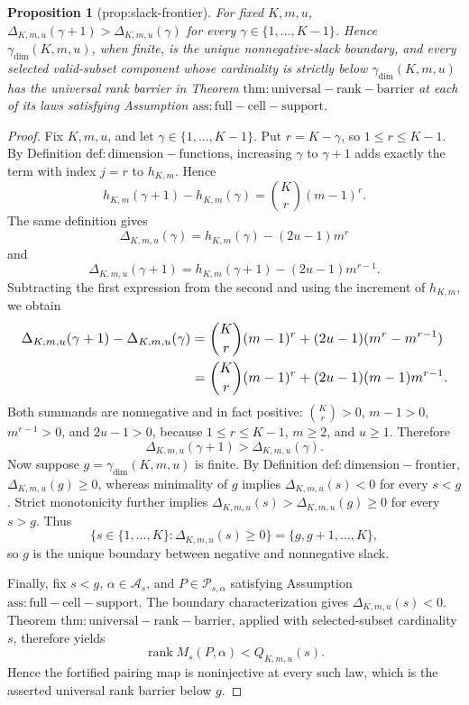 \documentclass{article}
\newtheorem{proposition}{Proposition}
\begin{document}
\begin{proposition}[prop:slack-frontier]\label{prop:slack-frontier}
For fixed \(K,m,u\), \(\Delta_{K,m,u}(\gamma+1)>\Delta_{K,m,u}(\gamma)\) for every \(\gamma\in\{1,\ldots,K-1\}\). Hence \(\gamma_{\mathrm{dim}}(K,m,u)\), when finite, is the unique nonnegative-slack boundary, and every selected valid-subset component whose cardinality is strictly below \(\gamma_{\mathrm{dim}}(K,m,u)\) has the universal rank barrier in Theorem \(\mathrm{thm:universal-rank-barrier}\) at each of its laws satisfying Assumption \(\mathrm{ass:full-cell-support}\).
\end{proposition}
\begin{proof}
Fix \(K,m,u\), and let \(\gamma\in\{1,\ldots,K-1\}\). Put \(r=K-\gamma\), so \(1\le r\le K-1\). By Definition \(\mathrm{def:dimension-functions}\), increasing \(\gamma\) to \(\gamma+1\) adds exactly the term with index \(j=r\) to \(h_{K,m}\). Hence
\[h_{K,m}(\gamma+1)-h_{K,m}(\gamma)=\binom Kr(m-1)^r.\]
The same definition gives
\[\Delta_{K,m,u}(\gamma)=h_{K,m}(\gamma)-(2u-1)m^r\]
and
\[\Delta_{K,m,u}(\gamma+1)=h_{K,m}(\gamma+1)-(2u-1)m^{r-1}.\]
Subtracting the first expression from the second and using the increment of \(h_{K,m}\), we obtain
\[
\makebox[\linewidth][c]{\resizebox{0.98\linewidth}{!}{\(\displaystyle \begin{aligned}
\Delta_{K,m,u}(\gamma+1)-\Delta_{K,m,u}(\gamma)
&=\binom Kr(m-1)^r+(2u-1)(m^r-m^{r-1})\\
&=\binom Kr(m-1)^r+(2u-1)(m-1)m^{r-1}.
\end{aligned}\)}}
\]
Both summands are nonnegative and in fact positive: \(\binom Kr>0\), \(m-1>0\), \(m^{r-1}>0\), and \(2u-1>0\), because \(1\le r\le K-1\), \(m\ge2\), and \(u\ge1\). Therefore
\[\Delta_{K,m,u}(\gamma+1)>\Delta_{K,m,u}(\gamma).\]
Now suppose \(g=\gamma_{\mathrm{dim}}(K,m,u)\) is finite. By Definition \(\mathrm{def:dimension-frontier}\), \(\Delta_{K,m,u}(g)\ge0\), whereas minimality of \(g\) implies \(\Delta_{K,m,u}(s)<0\) for every \(s<g\). Strict monotonicity further implies \(\Delta_{K,m,u}(s)>\Delta_{K,m,u}(g)\ge0\) for every \(s>g\). Thus
\[\{s\in\{1,\ldots,K\}:\Delta_{K,m,u}(s)\ge0\}=\{g,g+1,\ldots,K\},\]
so \(g\) is the unique boundary between negative and nonnegative slack.

Finally, fix \(s<g\), \(\alpha\in\mathcal A_s\), and \(P\in\mathcal P_{s,\alpha}\) satisfying Assumption \(\mathrm{ass:full-cell-support}\). The boundary characterization gives \(\Delta_{K,m,u}(s)<0\). Theorem \(\mathrm{thm:universal-rank-barrier}\), applied with selected-subset cardinality \(s\), therefore yields
\[\operatorname{rank}M_s(P,\alpha)<Q_{K,m,u}(s).\]
Hence the fortified pairing map is noninjective at every such law, which is the asserted universal rank barrier below \(g\).
\end{proof}
\end{document}
